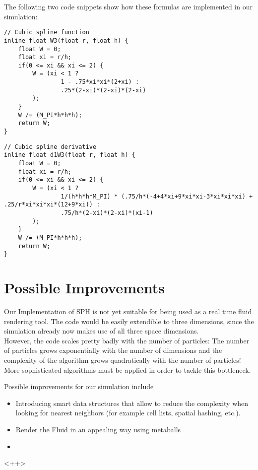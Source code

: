 \documentclass{sigchi}
\begin{document}
%
The following two code snippets show how these formulas are implemented in our simulation:
\FloatBarrier
\begin{lstlisting}[caption=Cubic Spline]
// Cubic spline function
inline float W3(float r, float h) {
	float W = 0;
	float xi = r/h;
	if(0 <= xi && xi <= 2) {
		W = (xi < 1 ? 
				1 - .75*xi*xi*(2+xi) :
				.25*(2-xi)*(2-xi)*(2-xi)
		);
	}
	W /= (M_PI*h*h*h);
	return W;
}
\end{lstlisting}
\FloatBarrier
%
\begin{lstlisting}[caption=First Derivative of Cubic Spline]
// Cubic spline derivative
inline float d1W3(float r, float h) {
	float W = 0;
	float xi = r/h;
	if(0 <= xi && xi <= 2) {
		W = (xi < 1 ? 
				1/(h*h*h*M_PI) * (.75/h*(-4+4*xi+9*xi*xi-3*xi*xi*xi) + .25/r*xi*xi*xi*(12+9*xi)) :
				.75/h*(2-xi)*(2-xi)*(xi-1)		
		);
	}
	W /= (M_PI*h*h*h);
	return W;
}
\end{lstlisting}
\FloatBarrier
%
\begin{comment}
\begin{lstlisting}[caption=Second Derivative of Cubic Spline]
Hello World
\end{lstlisting}
\end{comment}
%


\section{Possible Improvements}
%
Our Implementation of SPH is not yet suitable for being used as a real time fluid rendering tool.
The code would be easily extendible to three dimensions, since the simulation already now makes use of all three space dimensions. \\
However, the code scales pretty badly with the number of particles:
The number of particles grows exponentially with the number of dimensions and the complexity of the algorithm grows quadratically with the number of particles!
More sophisticated algorithms must be applied in order to tackle this bottleneck.
\par\medskip
%
Possible improvements for our simulation include
\begin{itemize}
	\item Introducing smart data structures that allow to reduce the complexity when looking for nearest neighbors (for example cell lists, spatial hashing, etc.).
	\item Render the Fluid in an appealing way using metaballs
	\item 
\end{itemize}<++>
\end{document}
